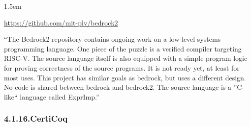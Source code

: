 \documentclass[12pt,twoside]{article}
\begin{document}
\begin{mddefinitions}%


\begin{mdbmarginx}{}{}{}{1.5em}%
\begin{mddefdata}%
\href{https://github.com/mit-plv/bedrock2}{{\ttfamily https://\hspace{0pt}github.\hspace{0pt}com/\hspace{0pt}mit-\hspace{0pt}plv/\hspace{0pt}bedrock2}}%
\end{mddefdata}%
\end{mdbmarginx}%
\end{mddefinitions}%

\noindent{}\textquotedblleft{}The Bedrock2 repository contains ongoing work on a low-level systems
programming language. One piece of the puzzle is a verified compiler
targeting RISC-V. The source language itself is also equipped with a
simple program logic for proving correctness of the source
programs. It is not ready yet, at least for most uses.  This project
has similar goals as bedrock, but uses a different design. No code is
shared between bedrock and bedrock2.
The source language is a \textquotedblright{}C-like\textquotedblleft{} language called ExprImp.\textquotedblright{}%

\subsubsection{4.1.16.\hspace*{0.5em}CertiCoq}%
\end{document}
